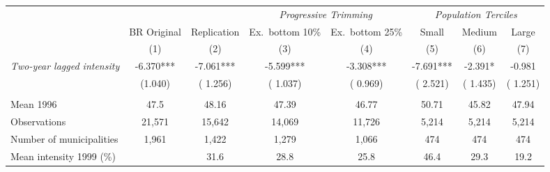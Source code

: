 \begin{tabular}{lccccccc} \hline \hline
& \multicolumn{1}{c}{} & \multicolumn{1}{c}{} & \multicolumn{2}{c}{\textit{Progressive Trimming}} & \multicolumn{3}{c}{\textit{Population Terciles}} \\ \cmidrule(lr){4-5} \cmidrule(lr){6-8}
& \multicolumn{1}{c}{BR Original} & \multicolumn{1}{c}{Replication} & \multicolumn{1}{c}{Ex.\ bottom 10\%} & \multicolumn{1}{c}{Ex.\ bottom 25\%} & \multicolumn{1}{c}{Small} & \multicolumn{1}{c}{Medium} & \multicolumn{1}{c}{Large} \\ 
\cmidrule(lr){2-2}\cmidrule(lr){3-3}\cmidrule(lr){4-4}\cmidrule(lr){5-5}\cmidrule(lr){6-6}\cmidrule(lr){7-7}\cmidrule(lr){8-8}
& \multicolumn{1}{c}{(1)} & \multicolumn{1}{c}{(2)} & \multicolumn{1}{c}{(3)} & \multicolumn{1}{c}{(4)} & \multicolumn{1}{c}{(5)} & \multicolumn{1}{c}{(6)} & \multicolumn{1}{c}{(7)} \\ \toprule 
\textit{Two-year lagged intensity} & -6.370*** &       -7.061*** &       -5.599*** &       -3.308*** &       -7.691*** &       -2.391* &       -0.981 \\ 
 & (1.040) & (       1.256) & (       1.037) & (       0.969) & (       2.521) & (       1.435) & (       1.251) \\ 
  & & & & & & & \\ 
Mean 1996 & 47.5 &        48.16 &        47.39 &        46.77 &        50.71 &        45.82 &        47.94 \\ 
Observations & 21,571 &       15,642 &       14,069 &       11,726 &        5,214 &        5,214 &        5,214 \\ 
Number of municipalities & 1,961 &        1,422 &        1,279 &        1,066 &          474 &          474 &          474 \\ 
Mean intensity 1999 (\%) & &   31.6 &   28.8 &   25.8 &   46.4 &   29.3 &   19.2 \\ 
\bottomrule
\end{tabular}